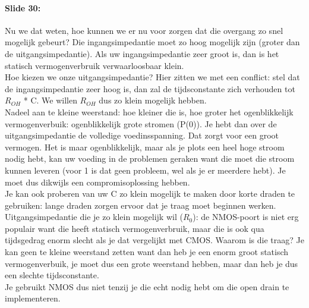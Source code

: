 \documentclass[10pt,a4paper]{book}
\begin{document}
\paragraph{Slide 30:}  Nu we dat weten, hoe kunnen we er nu voor zorgen dat die overgang zo snel mogelijk gebeurt? Die ingangsimpedantie moet zo hoog mogelijk zijn (groter dan de uitgangsimpedantie). Als uw ingangsimpedantie zeer groot is, dan is het statisch vermogenverbruik verwaarloosbaar klein. \\
Hoe kiezen we onze uitgangsimpedantie? Hier zitten we met een conflict: stel dat de ingangsimpedantie zeer hoog is, dan zal de tijdsconstante zich verhouden tot $R_{OH}$ * C. We willen $R_{OH}$ dus zo klein mogelijk hebben. \\
Nadeel aan te kleine weerstand: hoe kleiner die is, hoe groter het ogenblikkelijk vermogenverbuik: ogenblikkelijk grote stromen (P(0)). Je hebt dan over de uitgangsimpedantie de volledige voedinsspanning. Dat zorgt voor een groot vermogen. Het is maar ogenblikkelijk, maar als je plots een heel hoge stroom nodig hebt, kan uw voeding in de problemen geraken want die moet die stroom kunnen leveren (voor 1 is dat geen probleem, wel als je er meerdere hebt). Je moet dus dikwijls een compromisoplossing hebben.\\
Je kan ook proberen van uw C zo klein mogelijk te maken door korte draden te gebruiken: lange draden zorgen ervoor dat je traag moet beginnen werken. \\
Uitgangsimpedantie die je zo klein mogelijk wil ($R_0$): de NMOS-poort is niet erg populair want die heeft statisch vermogenverbruik, maar die is ook qua tijdsgedrag enorm slecht als je dat vergelijkt met CMOS. Waarom is die traag? Je kan geen te kleine weerstand zetten want dan heb je een enorm groot statisch vermogenverbuik, je moet dus een grote weerstand hebben, maar dan heb je dus een slechte tijdsconstante.\\
Je gebruikt NMOS dus niet tenzij je die echt nodig hebt om die open drain te implementeren.
\end{document}
